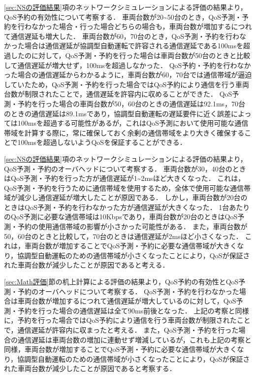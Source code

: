 \documentclass[a4paper,11pt,uplatex]{ujreport}
\begin{document}
  \ref{sec:NSの評価結果}項のネットワークシミュレーションによる評価の結果より，QoS予約の有効性について考察する．
  車両台数が20\textasciitilde50台のとき，QoS予測・予約を行わなかった場合・行った場合どちらの場合も，車両台数が増加するにつれて通信遅延も増大した．
  車両台数が60，70台のとき，QoS予測・予約を行わなかった場合は通信遅延が協調型自動運転で許容される通信遅延である100msを超過したのに対して，QoS予測・予約を行った場合は車両台数が50台のときと比較して通信遅延が増大せず，100msを超過しなかった．
  QoS予約・予約を行わなかった場合の通信遅延からわかるように，車両台数が60，70台では通信帯域が逼迫していたため，QoS予測・予約を行った場合ではQoS予約により通信を行う車両台数が制限されたことで，通信遅延を許容内に収めることができた．
  QoS予測・予約を行った場合の車両台数が50，60台のときの通信遅延は92.1ms，70台のときの通信遅延は89.1msであり，協調型自動運転の遅延要件に近く誤差によっては100msを超過する可能性があるが，これはQoS予測において使用可能な通信帯域を計算する際に，常に確保しておく余剰の通信帯域をより大きく確保することで100msを超過しないようQoSを保証することができる．\par
  \ref{sec:NSの評価結果}項のネットワークシミュレーションによる評価の結果より，QoS予測・予約のオーバヘッドについて考察する．
  車両台数が30，40台のときはQoS予測・予約を行った方が通信遅延が1\textasciitilde2msほど大きくなった．
  これは，QoS予測・予約を行うために通信帯域を使用するため，全体で使用可能な通信帯域が減少し通信遅延が増大したことが原因である．
  しかし，車両台数が20台のときはQoS予測・予約を行わなかった方が通信遅延が大きくなった．
  1台あたりのQoS予測に必要な通信帯域は10Kbpsであり，車両台数が20台のときはQoS予測・予約の使用通信帯域の影響が小さかった可能性がある．
  また，車両台数が50，60台のときと比較して，70台のときは通信遅延が2msほど小さくなった．
  これは，車両台数が増加することでQoS予測・予約に必要な通信帯域が大きくなり，協調型自動運転のための通信帯域が小さくなったことにより，QoSが保証された車両台数が減少したことが原因であると考える．\par
  \ref{sec:Math評価}節の机上計算による評価の結果より，QoS予約の有効性とQoS予測・予約のオーバヘッドについて考察する．
  QoS予測・予約を行わなかった場合は車両台数が増加するにつれて通信遅延が増大しているのに対して，QoS予測・予約を行った場合の通信遅延は全て90ms前後となった．
  上記の考察と同様に，予約を行った場合ではQoS予約により通信を行う車両台数が制限されたことで，通信遅延が許容内に収まったと考える．
  また，QoS予測・予約を行った場合の通信遅延は車両台数の増加に連動せず増減しているが，これも上記の考察と同様，車両台数が増加することでQoS予測・予約に必要な通信帯域が大きくなり，協調型自動運転のための通信帯域が小さくなったことにより，QoSが保証された車両台数が減少したことが原因であると考察する．\par
\end{document}

